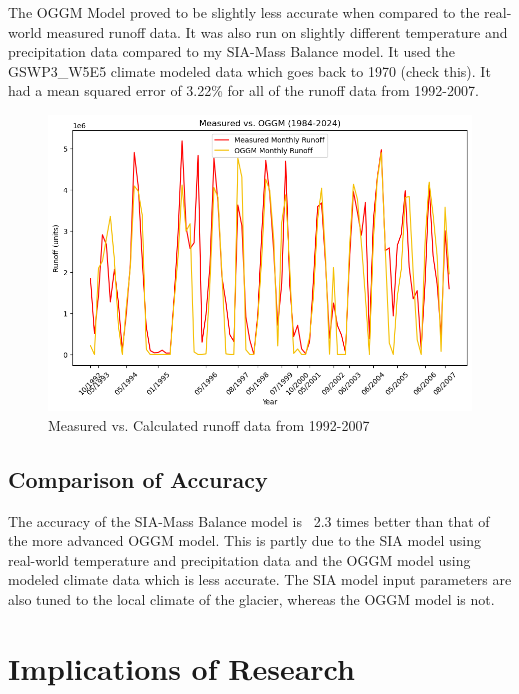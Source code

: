 \documentclass{article}
\begin{document}
The OGGM Model proved to be slightly less accurate when compared to the real-world measured runoff data. It was also run on slightly different 
temperature and precipitation data compared to my SIA-Mass Balance model. It used the GSWP3\_W5E5 climate modeled data which goes 
back to 1970 (check this). It had a mean squared error of 3.22\% for all of the runoff data from 1992-2007.
\begin{figure}[h!]
    \centering
    \includegraphics[width=\textwidth]{Plots/oggm_vs_measured.png}
    \caption{Measured vs. Calculated runoff data from 1992-2007}
    \label{fig:oggm_vs_measured}
\end{figure}
\FloatBarrier
\subsection{Comparison of Accuracy}
The accuracy of the SIA-Mass Balance model is ~2.3 times better than that of the more advanced OGGM model. This is partly due to the SIA model 
using real-world temperature and precipitation data and the OGGM model using modeled climate data which is less accurate. The SIA model input 
parameters are also tuned to the local climate of the glacier, whereas the OGGM model is not.

\section{Implications of Research}
\end{document}
